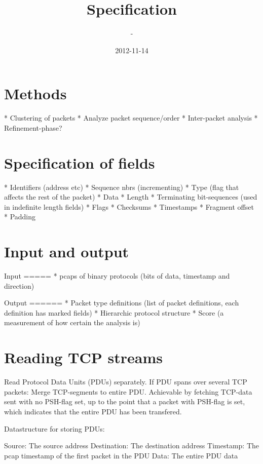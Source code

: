 \documentclass[]{article}
\title{Specification}
\author{-}
\date{2012-11-14}
\begin{document}
\ifpdf
{}
\else
{}
\fi

\clearpage

\section{Methods}

* Clustering of packets
* Analyze packet sequence/order
* Inter-packet analysis
* Refinement-phase?


\section{Specification of fields}

* Identifiers (address etc)
* Sequence nbrs (incrementing)
* Type (flag that affects the rest of the packet)
* Data
* Length
* Terminating bit-sequences (used in indefinite length fields)
* Flags
* Checksums
* Timestamps
* Fragment offset
* Padding

\section{Input and output}

Input
=====
* pcaps of binary protocols (bits of data, timestamp and direction)

Output
======
* Packet type definitions (list of packet definitions, each definition has marked fields)
* Hierarchic protocol structure
* Score (a measurement of how certain the analysis is)
    

\section{Reading TCP streams}

Read Protocol Data Units (PDUs) separately. If PDU spans over several TCP packets:
Merge TCP-segments to entire PDU. Achievable by fetching TCP-data sent with no
PSH-flag set, up to the point that a packet with PSH-flag is set, which indicates
that the entire PDU has been transfered.


Datastructure for storing PDUs:

Source: The source address
Destination: The destination address
Timestamp: The pcap timestamp of the first packet in the PDU
Data: The entire PDU data
\end{document}
